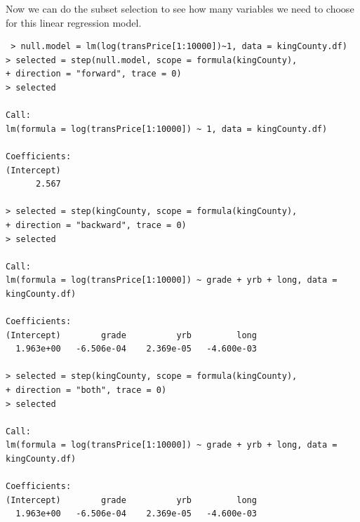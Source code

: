\documentclass{article}%
\begin{document}
Now we can do the subset selection to see how many variables we need to choose for this linear regression model.
 \begin{verbatim}
 > null.model = lm(log(transPrice[1:10000])~1, data = kingCounty.df)
> selected = step(null.model, scope = formula(kingCounty),
+ direction = "forward", trace = 0)
> selected

Call:
lm(formula = log(transPrice[1:10000]) ~ 1, data = kingCounty.df)

Coefficients:
(Intercept)  
      2.567  

> selected = step(kingCounty, scope = formula(kingCounty),
+ direction = "backward", trace = 0)
> selected

Call:
lm(formula = log(transPrice[1:10000]) ~ grade + yrb + long, data = kingCounty.df)

Coefficients:
(Intercept)        grade          yrb         long  
  1.963e+00   -6.506e-04    2.369e-05   -4.600e-03  

> selected = step(kingCounty, scope = formula(kingCounty),
+ direction = "both", trace = 0)
> selected

Call:
lm(formula = log(transPrice[1:10000]) ~ grade + yrb + long, data = kingCounty.df)

Coefficients:
(Intercept)        grade          yrb         long  
  1.963e+00   -6.506e-04    2.369e-05   -4.600e-03  


\end{verbatim}
\end{document}
